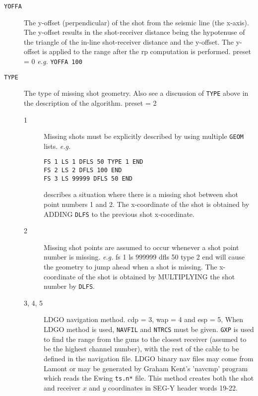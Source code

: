\begin{description}
\item[\texttt{YOFFA}] The y-offset (perpendicular) of the \gls{shot} from the seismic line
         (the x-axis).  The y-offset results in the shot-receiver
         distance being the hypotenuse of the triangle of the in-line
         shot-receiver distance and the y-offset.  The y-offset is
         applied to the range after the \gls{rp} computation is performed.
         \Gls{preset} = 0        \textit{e.g.}   \texttt{YOFFA 100}

\item[\texttt{TYPE}] The type of missing \gls{shot} geometry.  Also see a discussion of \texttt{TYPE}
         above in the description of the algorithm.
         \Gls{preset} = 2

\begin{description}
    \item[1] Missing \glspl{shot} must be explicitly described by using multiple
         \texttt{GEOM} lists.  \textit{e.g.}
\begin{verbatim}
FS 1 LS 1 DFLS 50 TYPE 1 END
FS 2 LS 2 DFLS 100 END
FS 3 LS 99999 DFLS 50 END
\end{verbatim}
         describes a situation where there is a missing \gls{shot} between \gls{shot}
         point numbers 1 and 2.  The x-coordinate of the \gls{shot} is obtained
         by ADDING \texttt{DLFS} to the previous \gls{shot} x-coordinate.

\item[2] Missing \gls{shot} points are assumed to occur whenever a \gls{shot}
         point number is missing.  \textit{e.g.} fs 1 ls 999999 dfls 50 type 2 end
         will cause the geometry to jump ahead when a \gls{shot} is missing.
         The x-coordinate of the \gls{shot} is obtained by MULTIPLYING the \gls{shot}
         number by \texttt{DLFS}.

\item[3, 4, 5] LDGO navigation method. \gls{cdp} = 3, \gls{wap} = 4 and \gls{esp} = 5,
         When LDGO method is used, \texttt{NAVFIL} and \texttt{NTRCS} must be given. \texttt{GXP} is
         used to find the range from the guns to the closest receiver
         (assumed to be the highest channel number), with the rest of the
         cable to be defined in the navigation file.
             LDGO binary nav files may come from Lamont or  may be
         generated by Graham Kent's 'navcmp' program which reads the
         Ewing \texttt{ts.n*} file.
             This method creates both the \gls{shot} and receiver $x$ and $y$
         coordinates in SEG-Y header words 19-22.


\end{description}
\end{description}
